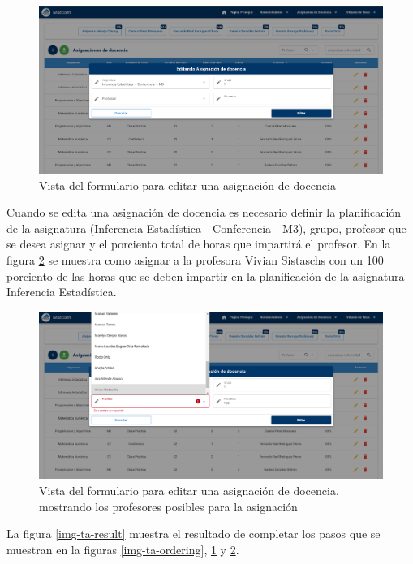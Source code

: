 \begin{figure}[H]
    \includegraphics[scale=0.3]{Graphics/Implementation/Docencia/AD-edit-form.png}
    \caption{Vista del formulario para editar una asignación de docencia}
    \label{img-ta-edit-form1}
\end{figure}


Cuando se edita una asignación de docencia es necesario definir la planificación de 
la asignatura (Inferencia Estadística---Conferencia---M3), grupo, profesor que se 
desea asignar y el porciento total de horas que impartirá el profesor. En la figura
\ref{img-ta-edit-form2} se muestra como asignar a la profesora Vivian Sistaschs con un 100
porciento de las horas que se deben impartir en la planificación de la asignatura Inferencia Estadística. 

\begin{figure}[H]
    \includegraphics[scale=0.3]{Graphics/Implementation/Docencia/AD-edit-form2.png}
    \caption{Vista del formulario para editar una asignación de docencia, mostrando los profesores posibles para la asignación}
    \label{img-ta-edit-form2}
\end{figure}



La figura \ref{img-ta-result} muestra el resultado de completar los pasos
que se muestran en la figuras \ref{img-ta-ordering}, \ref{img-ta-edit-form1} y \ref{img-ta-edit-form2}.

